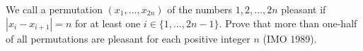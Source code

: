 We call a permutation $(x_1, \ldots, x_{2n})$ of the numbers $1, 2, \ldots, 2n$ pleasant if $|x_i - x_{i+1}| = n$ for at least one $i \in \{1, \ldots, 2n - 1\}$. Prove that more than one-half of all permutations are pleasant for each positive integer $n$ (IMO 1989).
